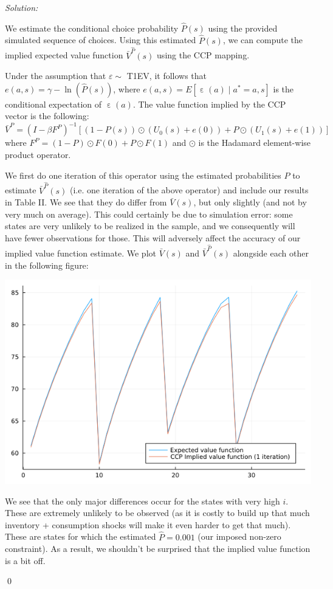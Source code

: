 \documentclass[12pt]{article}
\DeclareMathOperator{\eps}{\varepsilon}
\newenvironment{sol}
    {\emph{Solution:}
    }
    {
    \qed
    }
\begin{document}
\begin{sol}
    We estimate the conditional choice probability $\hat{P}(s)$ using the provided simulated sequence of choices. Using this estimated $\hat{P}(s)$, we can compute the implied expected value function $\bar{V}^{\hat{P}}(s)$ using the CCP mapping. 

    Under the assumption that $\varepsilon \sim $ T1EV, it follows that $e(a, s) = \gamma - \ln(\hat{P}(s))$, where $e(a, s) = E[\eps(a) \mid a^* = a, s]$ is the conditional expectation of $\eps(a)$. The value function implied by the CCP vector is the following:
    \[\bar{V}^P = (I - \beta F^P)^{-1}[(1-P(s)) \odot (U_0(s) + e(0)) + P \odot (U_1(s) + e(1))]\]
    where $F^P = (1 - P) \odot F(0) + P \odot F(1)$ and $\odot$ is the Hadamard element-wise product operator.

    We first do one iteration of this operator using the estimated probabilities $\hat{P}$ to estimate $\bar{V}^{\hat{P}}(s)$ (i.e. one iteration of the above operator) and include our results in Table II. We see that they do differ from $\bar{V}(s)$, but only slightly (and not by very much on average). This could certainly be due to simulation error: some states are very unlikely to be realized in the sample, and we consequently will have fewer observations for those. This will adversely affect the accuracy of our implied value function estimate. We plot $\bar{V}(s)$ and $\bar{V}^{\hat{P}}(s)$ alongside each other in the following figure: 
    \begin{center}
        \includegraphics[scale=0.5]{vfplot.png}
    \end{center}
    We see that the only major differences occur for the states with very high $i$. These are extremely unlikely to be observed (as it is costly to build up that much inventory + consumption shocks will make it even harder to get that much). These are states for which the estimated $\hat{P} = 0.001$ (our imposed non-zero constraint). As a result, we shouldn't be surprised that the implied value function is a bit off.
   


\end{sol}
\end{document}
